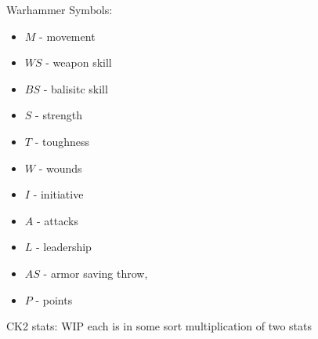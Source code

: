 \documentclass[10pt, english]{article}
\begin{document}
Warhammer Symbols:
\begin{itemize}
\item $M$ - movement
\item $WS$ - weapon skill
\item $BS$ - balisitc skill
\item $S$ - strength
\item $T$ - toughness
\item $W$ - wounds
\item $I$ - initiative
\item  $A$ - attacks
\item $L$ - leadership
\item $AS$ - armor saving throw,
\item $P$ - points
\end{itemize}
CK2 stats: WIP
each is in some sort multiplication of two stats
\end{document}
